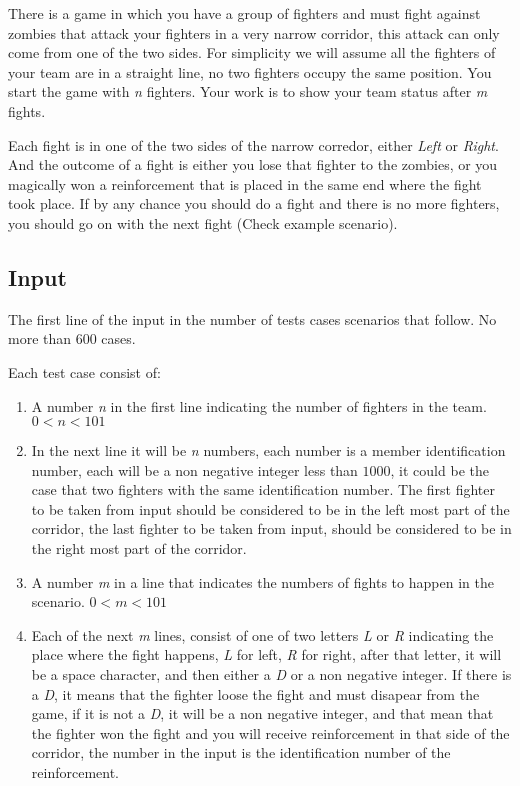 
There is a game in which you have a group of fighters and must fight against zombies that attack your fighters in a very narrow corridor, this attack can only come from one of the two sides. For simplicity we will assume all the fighters of your team are in a straight line, no two fighters occupy the same position. You start the game with \textit{n} fighters. Your work is to show your team status after \textit{m} fights.

Each fight is in one of the two sides of the narrow corredor, either \textit{Left} or \textit{Right}. And the outcome of a fight is either you lose that fighter to the zombies, or you magically won a reinforcement that is placed in the same end where the fight took place. If by any chance you should do a fight and there is no more fighters, you should go on with the next fight (Check example scenario).


\subsection* {Input}

The first line of the input in the number of tests cases scenarios that follow.  No more than 600 cases.

Each test case consist of:

\begin{enumerate}
	\item A number \textit{n} in the first line indicating the number of fighters in the team. $0 < n < 101$
	\item In the next line it will be \textit{n} numbers, each number is a member identification number, each will be a non negative integer less than $1000$, it could be the case that two fighters with the same identification number. The first fighter to be taken from input should be considered to be in the left most part of the corridor, the last fighter to be taken from input, should be considered to be in the right most part of the corridor.
	\item A number \textit{m} in a line that indicates the numbers of fights to happen in the scenario. $0 < m < 101$
	\item Each of the next \textit{m} lines, consist of one of two letters \textit{L} or \textit{R} indicating the place where the fight happens, \textit{L} for left, \textit{R} for right, after that letter, it will be a space character, and then either a \textit{D} or a non negative integer. If there is a \textit{D}, it means  that the fighter loose the fight and must disapear from the game, if it is not a \textit{D}, it will be a non negative integer, and that mean that the fighter won the fight and you will receive reinforcement in that side of the corridor, the number in the input is the identification number of the reinforcement. 
\end{enumerate}

